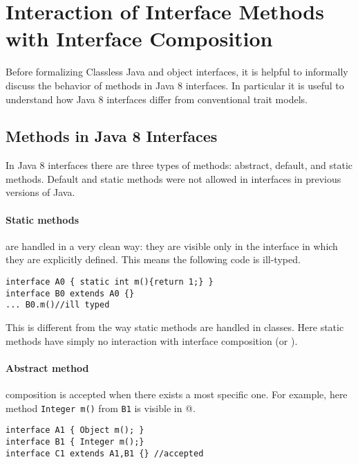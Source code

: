 \section{Interaction of Interface Methods with Interface Composition}
Before formalizing Classless Java and object interfaces, it is helpful
to informally discuss the behavior of methods in Java 8
interfaces. In particular it is useful to understand how Java 8
interfaces differ from conventional trait models.


\subsection{Methods in Java 8 Interfaces}
In Java 8 interfaces there are three types of methods: abstract, default, and static methods. Default and static methods were not allowed in interfaces in previous versions of Java.

\paragraph{Static methods} are handled in a very clean way: they are visible only in
  the interface in which they are explicitly defined. This means the following code
  is ill-typed.
\begin{lstlisting}
interface A0 { static int m(){return 1;} }
interface B0 extends A0 {}
... B0.m()//ill typed
\end{lstlisting}
This is different from the way static methods are handled in classes. Here
static methods have simply no interaction with interface
composition (\Q@extends@ or \Q@implements@).

\paragraph{Abstract method} composition is accepted when there exists a most specific one.
  For example, here method \texttt{Integer m()} from \texttt{B1} is visible in @.
\begin{lstlisting}
interface A1 { Object m(); }
interface B1 { Integer m();}
interface C1 extends A1,B1 {} //accepted
\end{lstlisting}

